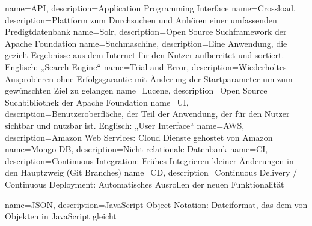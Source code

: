 {
    name={API},
    description={Application Programming Interface}
}
{
    name={Crossload},
    description={Plattform zum Durchsuchen und Anhören einer umfassenden Predigtdatenbank}
}
{
    name={Solr},
    description={Open Source Suchframework der Apache Foundation}
}
{
    name={Suchmaschine},
    description={Eine Anwendung, die gezielt Ergebnisse aus dem Internet für den Nutzer aufbereitet und sortiert. Englisch: „Search Engine“}
}
{
    name={Trial-and-Error},
    description={Wiederholtes Ausprobieren ohne Erfolgsgarantie mit Änderung der Startparameter um zum gewünschten Ziel zu gelangen}
}
{
    name={Lucene},
    description={Open Source Suchbibliothek der Apache Foundation}
}
{
    name={UI},
    description={Benutzeroberfläche, der Teil der Anwendung, der für den Nutzer sichtbar und nutzbar ist. Englisch: „User Interface“}
}
{
    name={AWS},
    description={Amazon Web Services: Cloud Dienste gehostet von Amazon}
}
{
    name={Mongo DB},
    description={Nicht relationale Datenbank}
}
{
    name={CI},
    description={Continuous Integration: Frühes Integrieren kleiner Änderungen in den Hauptzweig (Git Branches)}
}
{
    name={CD},
    description={Continuous Delivery / Continuous Deployment: Automatisches Ausrollen der neuen Funktionalität}
}

{
    name={JSON},
    description={JavaScript Object Notation: Dateiformat, das dem von Objekten in JavaScript gleicht}
}


\glsaddall
